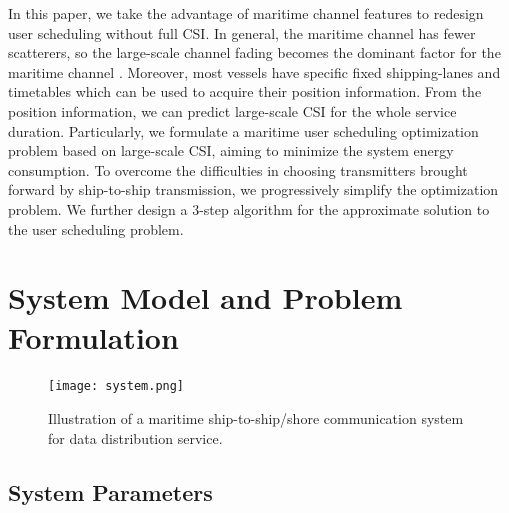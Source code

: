 \documentclass[journal]{IEEEtran}
\begin{document}
 

 In this paper, we take the advantage of maritime channel features to redesign user scheduling without full CSI. In general, the maritime channel has fewer scatterers, so the large-scale channel fading becomes the dominant factor for the maritime channel \cite{p403}. Moreover, most vessels have specific fixed shipping-lanes and timetables which can be used to acquire their position information. From the position information, we can predict large-scale CSI for the whole service duration. Particularly, we formulate a maritime user scheduling optimization problem based on large-scale CSI, aiming to minimize the system energy consumption. To overcome the difficulties in choosing transmitters brought forward by ship-to-ship transmission, we progressively simplify the optimization problem. We further design a 3-step algorithm for the approximate solution to the user scheduling problem. 

 \section{System Model and Problem Formulation}\label{sec:2}
 
 \begin{figure} [htb]
 \begin{center}
 \texttt{[image: system.png]}
 \end{center}
 \vspace*{-4mm} 
 \caption{Illustration of a maritime ship-to-ship/shore communication system for data distribution service.}\label{fig:1}
 \vspace*{-4mm} 
 \end{figure}
 
 
 \subsection{System Parameters}
 
\end{document}
